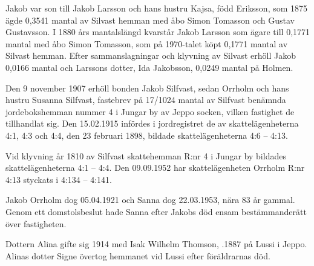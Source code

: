 Jakob var son till Jakob Larsson och hans hustru Kajsa, född Eriksson, som 1875 ägde 0,3541 mantal av Silvast hemman med åbo Simon Tomasson och Gustav Gustavsson. I 1880 års mantalslängd kvarstår Jakob Larsson som ägare till 0,1771 mantal med åbo Simon Tomasson, som på 1970-talet köpt 0,1771 mantal av Silvast hemman. Efter sammanslagningar och klyvning av Silvast erhöll Jakob 0,0166 mantal och Larssons dotter, Ida Jakobsson, 0,0249 mantal på Holmen.

Den 9 november 1907 erhöll bonden Jakob Silfvast, sedan Orrholm och hans hustru Susanna Silfvast, fastebrev på 17/1024 mantal av Silfvast benämnda jordebokshemman nummer 4 i Jungar by av Jeppo socken, vilken fastighet de tillhandlat sig.
Den 15.02.1915 infördes i jordregistret de av skattelägenheterna 4:1, 4:3 och 4:4, den 23 februari 1898, bildade skattelägenheterna 4:6 – 4:13.

Vid klyvning år 1810 av Silfvast skattehemman R:nr 4 i Jungar by bildades skattelägenheterna 4:1 – 4:4. Den 09.09.1952 har skattelägenheten Orrholm R:nr 4:13 styckats i 4:134 – 4:141.
\begin{jhchildren}
  \item {}
  \item {}
  \item {}
  \item {}
  \item {}
  \item {}
  \item {}
  \item {}
  \item {}
\end{jhchildren}
Jakob Orrholm dog 05.04.1921 och Sanna dog 22.03.1953, nära 83 år gammal. Genom ett domstolsbeslut hade Sanna efter Jakobs död ensam bestämmanderätt över fastigheten.

Dottern Alina gifte sig 1914 med Isak Wilhelm Thomson, .1887 på Lussi i Jeppo. Alinas dotter Signe övertog hemmanet vid Lussi efter föräldrarnas död.

